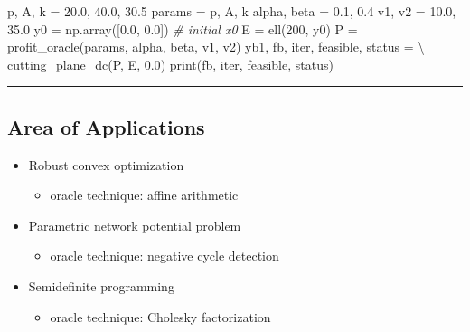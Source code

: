 \documentclass[]{article}
\newenvironment{Shaded}{}{}
\newcommand{\BuiltInTok}[1]{#1}
\newcommand{\CommentTok}[1]{\textcolor[rgb]{0.38,0.63,0.69}{\textit{#1}}}
\newcommand{\DecValTok}[1]{\textcolor[rgb]{0.25,0.63,0.44}{#1}}
\newcommand{\FloatTok}[1]{\textcolor[rgb]{0.25,0.63,0.44}{#1}}
\newcommand{\NormalTok}[1]{#1}
\newcommand{\OperatorTok}[1]{\textcolor[rgb]{0.40,0.40,0.40}{#1}}
\providecommand{\tightlist}{%
  \setlength{\itemsep}{0pt}\setlength{\parskip}{0pt}}
\begin{document}
\begin{Shaded}
\begin{Highlighting}[]
\NormalTok{p, A, k }\OperatorTok{=} \FloatTok{20.0}\NormalTok{, }\FloatTok{40.0}\NormalTok{, }\FloatTok{30.5}
\NormalTok{params }\OperatorTok{=}\NormalTok{ p, A, k}
\NormalTok{alpha, beta }\OperatorTok{=} \FloatTok{0.1}\NormalTok{, }\FloatTok{0.4}
\NormalTok{v1, v2 }\OperatorTok{=} \FloatTok{10.0}\NormalTok{, }\FloatTok{35.0}
\NormalTok{y0 }\OperatorTok{=}\NormalTok{ np.array([}\FloatTok{0.0}\NormalTok{, }\FloatTok{0.0}\NormalTok{])  }\CommentTok{# initial x0}
\NormalTok{E }\OperatorTok{=}\NormalTok{ ell(}\DecValTok{200}\NormalTok{, y0)}
\NormalTok{P }\OperatorTok{=}\NormalTok{ profit_oracle(params, alpha, beta, v1, v2)}
\NormalTok{yb1, fb, }\BuiltInTok{iter}\NormalTok{, feasible, status }\OperatorTok{=} \OperatorTok{\textbackslash{}}
\NormalTok{    cutting_plane_dc(P, E, }\FloatTok{0.0}\NormalTok{)}
\BuiltInTok{print}\NormalTok{(fb, }\BuiltInTok{iter}\NormalTok{, feasible, status)}
\end{Highlighting}
\end{Shaded}

\begin{center}\rule{0.5\linewidth}{\linethickness}\end{center}

\hypertarget{area-of-applications}{%
\subsection{Area of Applications}\label{area-of-applications}}

\begin{itemize}
\tightlist
\item
  Robust convex optimization

  \begin{itemize}
  \tightlist
  \item
    oracle technique: affine arithmetic
  \end{itemize}
\item
  Parametric network potential problem

  \begin{itemize}
  \tightlist
  \item
    oracle technique: negative cycle detection
  \end{itemize}
\item
  Semidefinite programming

  \begin{itemize}
  \tightlist
  \item
    oracle technique: Cholesky factorization
  \end{itemize}
\end{itemize}
\end{document}
